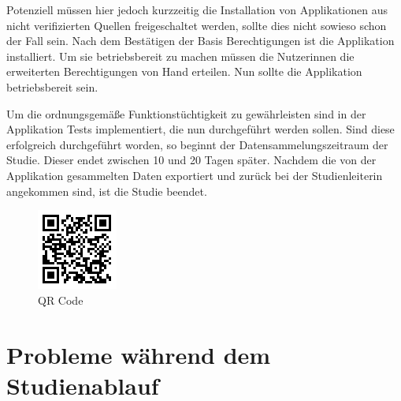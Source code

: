 Potenziell müssen hier jedoch kurzzeitig die Installation von Applikationen aus nicht verifizierten Quellen freigeschaltet werden, sollte dies nicht sowieso schon der Fall sein.
Nach dem Bestätigen der Basis Berechtigungen ist die Applikation installiert.
Um sie betriebsbereit zu machen müssen die Nutzerinnen die erweiterten Berechtigungen von Hand erteilen.
Nun sollte die Applikation betriebsbereit sein.
\par
Um die ordnungsgemäße Funktionstüchtigkeit zu gewährleisten sind in der Applikation Tests implementiert, die nun durchgeführt werden sollen.
Sind diese erfolgreich durchgeführt worden, so beginnt der Datensammelungszeitraum der Studie.
Dieser endet zwischen 10 und 20 Tagen später.
Nachdem die von der Applikation gesammelten Daten exportiert und zurück bei der Studienleiterin angekommen sind, 
ist die Studie beendet.

\begin{figure}[h]
    \centering
    \includegraphics{images/qrcode.png}
    \caption{QR Code}
    \label{fig:qrcode}
\end{figure}


\section{Probleme während dem Studienablauf}

